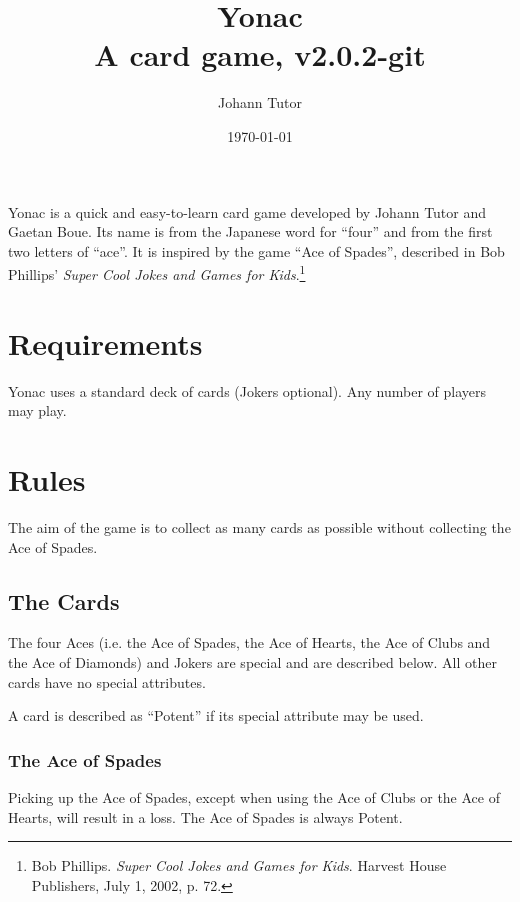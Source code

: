 \documentclass{article}
\newcommand\theversion{2.0.2-git}
\begin{document}
\title{Yonac\\ \large A card game, v\theversion}
\author{Johann Tutor}
\date{\today}
\maketitle

Yonac is a quick and easy-to-learn card game developed by Johann Tutor
and Gaetan Boue. Its name is from the Japanese word for ``four'' and
from the first two letters of ``ace''. It is inspired by the game ``Ace
of Spades'', described in Bob Phillips' \textit{Super Cool Jokes and Games for Kids}.\footnote{Bob Phillips. \textit{Super Cool Jokes and Games for Kids}. Harvest House Publishers, July 1, 2002, p. 72.}

\tableofcontents

\newpage

\section{Requirements \label{sec:requirements}}

Yonac uses a standard deck of cards (Jokers optional). Any number of
players may play.

\section{Rules \label{sec:rules}}

The aim of the game is to collect as many cards as possible without
collecting the Ace of Spades.

\subsection{The Cards \label{sec:cards}}

The four Aces (i.e. the Ace of Spades, the Ace of Hearts, the Ace of Clubs and
the Ace of Diamonds) and Jokers are special and are described below. All other
cards have no special attributes.

A card is described as ``Potent'' if its special attribute may be used.

\subsubsection{The Ace of Spades \label{sec:acespades}}
Picking up the Ace of Spades, except when using the Ace of Clubs or the
Ace of Hearts, will result in a loss. The Ace of Spades is always Potent.
\end{document}
